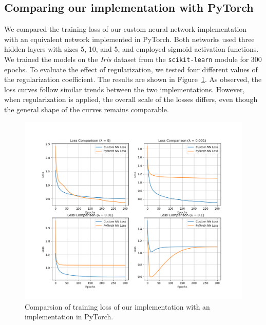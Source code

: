 \documentclass[9pt]{IEEEtran}
\begin{document}
\subsection{Comparing our implementation with PyTorch}
We compared the training loss of our custom neural network implementation with an equivalent network implemented in PyTorch. Both networks used three hidden layers with sizes 5, 10, and 5, and employed sigmoid activation functions. We trained the models on the \textit{Iris} dataset from the \texttt{scikit-learn} module for 300 epochs. To evaluate the effect of regularization, we tested four different values of the regularization coefficient. The results are shown in Figure~\ref{fig:pytorch}. As observed, the loss curves follow similar trends between the two implementations. However, when regularization is applied, the overall scale of the losses differs, even though the general shape of the curves remains comparable.

\begin{figure}[h]
    \centering
    \includegraphics[width=1\columnwidth]{figures/pytorch_comparison.png}
    \caption{Comparsion of training loss of our implementation with an implementation in PyTorch.}
    \label{fig:pytorch}
\end{figure}


\section{}



\end{document}
